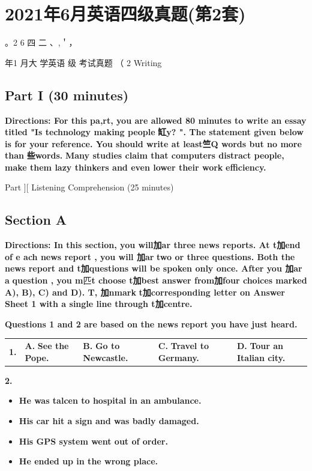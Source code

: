 \documentclass[UTF8,11pt]{ctexart}
\begin{document}
\section*{2021年6月英语四级真题(第2套)}
。2 6 四 二 、,＇，


年1 月大 学英语 级 考试真题 （ 2 Writing


\subsection*{Part I (30 minutes)}


\textbf{Directions: For this pa,rt, you are allowed 80 minutes to write an essay titled "Is technology making people} \textbf{缸y? ". The statement given below is for your reference. You should write at least竺Q words but no more than} \textbf{些words.} \textbf{Many studies claim that computers distract people, make them lazy thinkers and even lower their work} \textbf{efficiency.}


Part ][ Listening Comprehension (25 minutes)


\subsection*{Section A}


\textbf{Directions: In this section, you will加ar three news reports. At t加end of e ach news report , you will 加ar} \textbf{two or three questions. Both the news report and t加questions will be spoken only once. After you 加ar a} \textbf{question , you m}匹\textbf{t choose t加best answer from加four choices marked A), B), C) and D). T, 加nmark} \textbf{t加corresponding letter on Answer Sheet 1 with a single line through t加centre.}


\textbf{Questions 1 and 2 are based on the news report you have just heard.}


\noindent\begin{tabularx}{\linewidth}{@{}lXXXX@{}}\textbf{1.} & \textbf{A.} \textbf{See the Pope.} & \textbf{B.} \textbf{Go to Newcastle.} & \textbf{C.} \textbf{Travel to Germany.} & \textbf{D.} \textbf{Tour an Italian city.}\\\end{tabularx}\par

\textbf{2.}


\begin{itemize}[leftmargin=2em,itemsep=.2em,topsep=.4em]\item[A.] \textbf{He was talcen to hospital in an ambulance.}
\item[B.] \textbf{His car hit a sign and was badly damaged.}
\item[C.] \textbf{His GPS system went out of order.}
\item[D.] \textbf{He ended up in the wrong place.}
\end{itemize}
\end{document}
